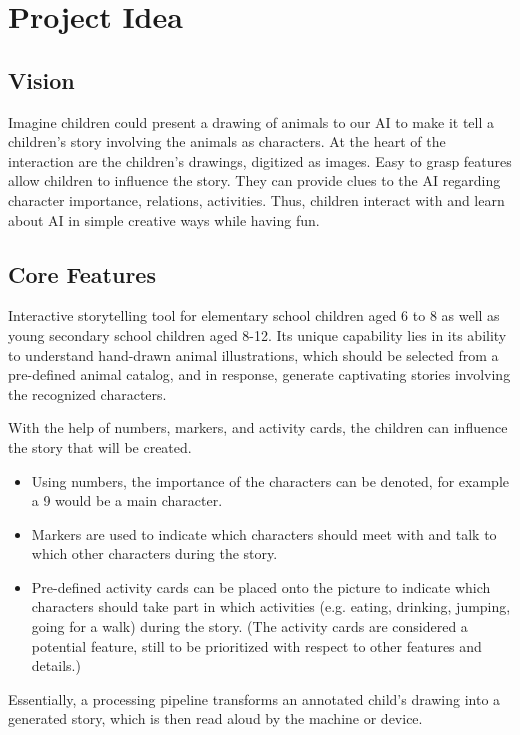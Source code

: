 \section{Project Idea}
\subsection{Vision}
Imagine children could present a drawing of animals to our AI to make it tell a children’s story involving the animals as characters. At the heart of the interaction are the children’s drawings, digitized as images. Easy to grasp features allow children to influence the story. They can provide clues to the AI regarding character importance, relations, activities. Thus, children interact with and learn about AI in simple creative ways while having fun.

\subsection{Core Features}
Interactive storytelling tool for elementary school children aged 6 to 8 as well as young secondary school children aged 8-12. Its unique capability lies in its ability to understand hand-drawn animal illustrations, which should be selected from a pre-defined animal catalog, and in response, generate captivating stories involving the recognized characters. \par
With the help of numbers, markers, and activity cards, the children can influence the story that will be created.
\begin{itemize}
    \item Using numbers, the importance of the characters can be denoted, for example a 9 would be a main character.
    \item Markers are used to indicate which characters should meet with and talk to which other characters during the story.
    \item Pre-defined activity cards can be placed onto the picture to indicate which characters should take part in which activities (e.g. eating, drinking, jumping, going for a walk) during the story. (The activity cards are considered a potential feature, still to be prioritized with respect to other features and details.)
  \end{itemize}
Essentially, a processing pipeline transforms an annotated child’s drawing into a generated story, which is then read aloud by the machine or device.
